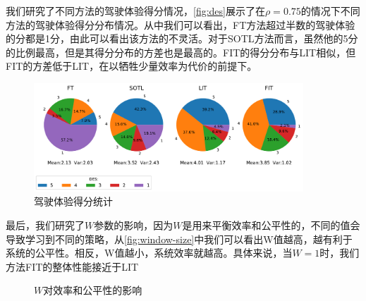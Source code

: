 我们研究了不同方法的驾驶体验得分情况，\autoref{fig:des}展示了在$\rho=0.75$的情况下不同方法的驾驶体验得分分布情况。从中我们可以看出，FT方法超过半数的驾驶体验的分都是1分，由此可以看出该方法的不灵活。对于SOTL方法而言，虽然他的5分的比例最高，但是其得分分布的方差也是最高的。FIT的得分分布与LIT相似，但FIT的方差低于LIT，在以牺牲少量效率为代价的前提下。
\begin{figure}[t]
    \centering
    \includegraphics[width=0.9\textwidth]{fig/des.pdf}
    \caption{驾驶体验得分统计}
    \label{fig:des}
\end{figure}

最后，我们研究了$W$参数的影响，因为$W$是用来平衡效率和公平性的，不同的值会导致学习到不同的策略，从\autoref{fig:window-size}中我们可以看出W值越高，越有利于系统的公平性。相反，W值越小，系统效率就越高。具体来说，当$W=1$时，我们方法FIT的整体性能接近于LIT
\begin{figure}[htb]
    
    \caption{$W$对效率和公平性的影响}
    \label{fig:window-size}
  \end{figure}


